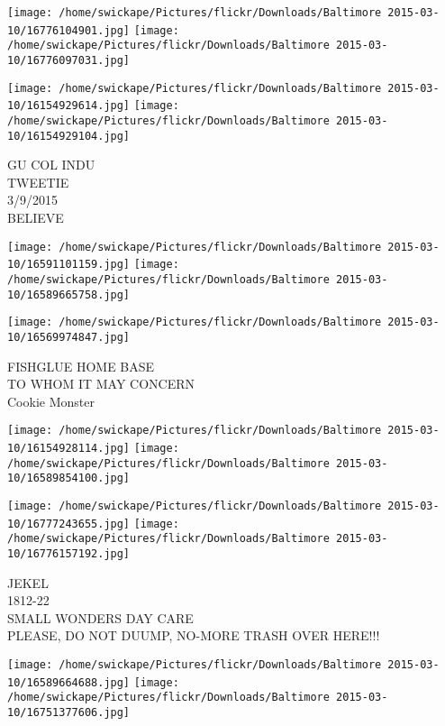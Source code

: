 \documentclass[10pt,letterpaper]{article}
\begin{document}
\texttt{[image: /home/swickape/Pictures/flickr/Downloads/Baltimore 2015-03-10/16776104901.jpg]}
\texttt{[image: /home/swickape/Pictures/flickr/Downloads/Baltimore 2015-03-10/16776097031.jpg]}

\texttt{[image: /home/swickape/Pictures/flickr/Downloads/Baltimore 2015-03-10/16154929614.jpg]}
\texttt{[image: /home/swickape/Pictures/flickr/Downloads/Baltimore 2015-03-10/16154929104.jpg]}

GU COL INDU\\
TWEETIE\\
3/9/2015\\
BELIEVE\\
\pagebreak

\texttt{[image: /home/swickape/Pictures/flickr/Downloads/Baltimore 2015-03-10/16591101159.jpg]}
\texttt{[image: /home/swickape/Pictures/flickr/Downloads/Baltimore 2015-03-10/16589665758.jpg]}

\vspace{0.25in}
\texttt{[image: /home/swickape/Pictures/flickr/Downloads/Baltimore 2015-03-10/16569974847.jpg]}

FISHGLUE HOME BASE\\
TO WHOM IT MAY CONCERN\\
Cookie Monster\\
\pagebreak

\texttt{[image: /home/swickape/Pictures/flickr/Downloads/Baltimore 2015-03-10/16154928114.jpg]}
\texttt{[image: /home/swickape/Pictures/flickr/Downloads/Baltimore 2015-03-10/16589854100.jpg]}

\texttt{[image: /home/swickape/Pictures/flickr/Downloads/Baltimore 2015-03-10/16777243655.jpg]}
\texttt{[image: /home/swickape/Pictures/flickr/Downloads/Baltimore 2015-03-10/16776157192.jpg]}

JEKEL\\
1812{-}22\\
SMALL WONDERS DAY CARE\\
PLEASE, DO NOT DUUMP, NO{-}MORE TRASH OVER HERE!!!\\
\pagebreak

\texttt{[image: /home/swickape/Pictures/flickr/Downloads/Baltimore 2015-03-10/16589664688.jpg]}
\texttt{[image: /home/swickape/Pictures/flickr/Downloads/Baltimore 2015-03-10/16751377606.jpg]}
\end{document}
